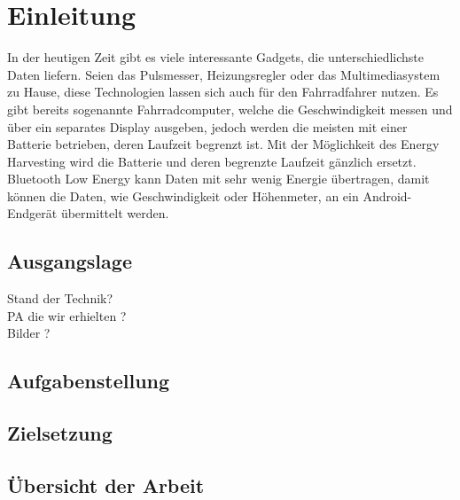 \chapter{Einleitung}
In der heutigen Zeit gibt es viele interessante Gadgets, die unterschiedlichste Daten liefern. Seien das Pulsmesser, Heizungsregler oder das Multimediasystem zu Hause, diese Technologien lassen sich auch für den Fahrradfahrer nutzen. Es gibt bereits sogenannte Fahrradcomputer, welche die Geschwindigkeit messen und über ein separates Display ausgeben, jedoch werden die meisten mit einer Batterie betrieben, deren Laufzeit begrenzt ist. Mit der Möglichkeit des Energy Harvesting wird die Batterie und deren begrenzte Laufzeit gänzlich ersetzt. Bluetooth Low Energy kann Daten mit sehr wenig Energie übertragen, damit können die Daten, wie Geschwindigkeit oder Höhenmeter, an ein Android-Endgerät übermittelt werden.


\section{Ausgangslage}
Stand der Technik?\\

PA die wir erhielten ?\\

 
Bilder ?\\


\section{Aufgabenstellung}



\section{Zielsetzung}





\section{Übersicht der Arbeit}
